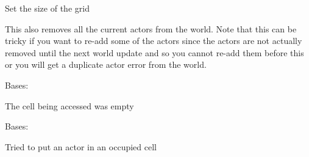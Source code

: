 \documentclass[letterpaper,10pt,english]{sphinxmanual}
\begin{document}
\begin{fulllineitems}
\begin{fulllineitems}
\end{fulllineitems}


\begin{fulllineitems}
\label{blocks:serge.blocks.layout.BaseGrid.setGrid}
Set the size of the grid

This also removes all the current actors from the world. Note that
this can be tricky if you want to re-add some of the actors since
the actors are not actually removed until the next world update
and so you cannot re-add them before this or you will get a duplicate
actor error from the world.

\end{fulllineitems}


\end{fulllineitems}


\begin{fulllineitems}
\label{blocks:serge.blocks.layout.CellEmpty}
Bases: 

The cell being accessed was empty

\end{fulllineitems}


\begin{fulllineitems}
\label{blocks:serge.blocks.layout.CellOccupied}
Bases: 

Tried to put an actor in an occupied cell

\end{fulllineitems}

\end{document}
